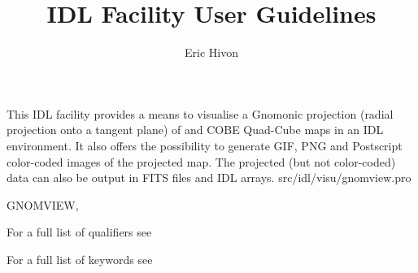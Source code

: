 




\sloppy



\title{\healpix IDL Facility User Guidelines}
 \section[gnomview]{ }
\label{idl:\thedocid}
\author{Eric Hivon}



\begin{facility}
{This IDL facility provides a means to visualise a Gnomonic projection 
(radial projection onto a tangent plane) of
\healpix and COBE Quad-Cube maps in an IDL environment. 
It also offers the possibility to
generate GIF, PNG and Postscript color-coded images of the projected map.
The projected (but not color-coded) data can also be output in FITS files and
IDL arrays.}
{src/idl/visu/gnomview.pro}
\end{facility}

\begin{IDLformat}
{GNOMVIEW, 

}
\end{IDLformat}

\begin{qualifiers}
  \begin{qulist}{} %
\item [{\  }] For a full list of qualifiers see 
  \end{qulist}
\end{qualifiers}

\begin{keywords}
  \begin{kwlist}{} %
\item [{\  }] For a full list of keywords see 
  \end{kwlist}
\end{keywords}


